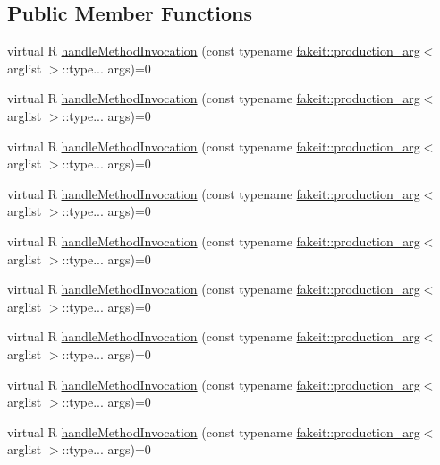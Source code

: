 \subsection*{Public Member Functions}
\begin{DoxyCompactItemize}
\item 
virtual R \mbox{\hyperlink{structfakeit_1_1MethodInvocationHandler_a6ef3fe1e948c1886a085bd948d61f730}{handle\+Method\+Invocation}} (const typename \mbox{\hyperlink{structfakeit_1_1production__arg}{fakeit\+::production\+\_\+arg}}$<$ arglist $>$\+::type... args)=0
\item 
virtual R \mbox{\hyperlink{structfakeit_1_1MethodInvocationHandler_a6ef3fe1e948c1886a085bd948d61f730}{handle\+Method\+Invocation}} (const typename \mbox{\hyperlink{structfakeit_1_1production__arg}{fakeit\+::production\+\_\+arg}}$<$ arglist $>$\+::type... args)=0
\item 
virtual R \mbox{\hyperlink{structfakeit_1_1MethodInvocationHandler_a6ef3fe1e948c1886a085bd948d61f730}{handle\+Method\+Invocation}} (const typename \mbox{\hyperlink{structfakeit_1_1production__arg}{fakeit\+::production\+\_\+arg}}$<$ arglist $>$\+::type... args)=0
\item 
virtual R \mbox{\hyperlink{structfakeit_1_1MethodInvocationHandler_a6ef3fe1e948c1886a085bd948d61f730}{handle\+Method\+Invocation}} (const typename \mbox{\hyperlink{structfakeit_1_1production__arg}{fakeit\+::production\+\_\+arg}}$<$ arglist $>$\+::type... args)=0
\item 
virtual R \mbox{\hyperlink{structfakeit_1_1MethodInvocationHandler_a6ef3fe1e948c1886a085bd948d61f730}{handle\+Method\+Invocation}} (const typename \mbox{\hyperlink{structfakeit_1_1production__arg}{fakeit\+::production\+\_\+arg}}$<$ arglist $>$\+::type... args)=0
\item 
virtual R \mbox{\hyperlink{structfakeit_1_1MethodInvocationHandler_a6ef3fe1e948c1886a085bd948d61f730}{handle\+Method\+Invocation}} (const typename \mbox{\hyperlink{structfakeit_1_1production__arg}{fakeit\+::production\+\_\+arg}}$<$ arglist $>$\+::type... args)=0
\item 
virtual R \mbox{\hyperlink{structfakeit_1_1MethodInvocationHandler_a6ef3fe1e948c1886a085bd948d61f730}{handle\+Method\+Invocation}} (const typename \mbox{\hyperlink{structfakeit_1_1production__arg}{fakeit\+::production\+\_\+arg}}$<$ arglist $>$\+::type... args)=0
\item 
virtual R \mbox{\hyperlink{structfakeit_1_1MethodInvocationHandler_a6ef3fe1e948c1886a085bd948d61f730}{handle\+Method\+Invocation}} (const typename \mbox{\hyperlink{structfakeit_1_1production__arg}{fakeit\+::production\+\_\+arg}}$<$ arglist $>$\+::type... args)=0
\item 
virtual R \mbox{\hyperlink{structfakeit_1_1MethodInvocationHandler_a6ef3fe1e948c1886a085bd948d61f730}{handle\+Method\+Invocation}} (const typename \mbox{\hyperlink{structfakeit_1_1production__arg}{fakeit\+::production\+\_\+arg}}$<$ arglist $>$\+::type... args)=0
\end{DoxyCompactItemize}


